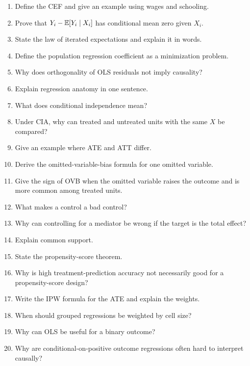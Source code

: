 \begin{enumerate}
    \item Define the CEF and give an example using wages and schooling.
    \item Prove that \(Y_i-\mathbb{E}[Y_i\mid X_i]\) has conditional mean zero given
    \(X_i\).
    \item State the law of iterated expectations and explain it in words.
    \item Define the population regression coefficient as a minimization
    problem.
    \item Why does orthogonality of OLS residuals not imply causality?
    \item Explain regression anatomy in one sentence.
    \item What does conditional independence mean?
    \item Under CIA, why can treated and untreated units with the same \(X\) be
    compared?
    \item Give an example where ATE and ATT differ.
    \item Derive the omitted-variable-bias formula for one omitted variable.
    \item Give the sign of OVB when the omitted variable raises the outcome and
    is more common among treated units.
    \item What makes a control a bad control?
    \item Why can controlling for a mediator be wrong if the target is the total
    effect?
    \item Explain common support.
    \item State the propensity-score theorem.
    \item Why is high treatment-prediction accuracy not necessarily good for a
    propensity-score design?
    \item Write the IPW formula for the ATE and explain the weights.
    \item When should grouped regressions be weighted by cell size?
    \item Why can OLS be useful for a binary outcome?
    \item Why are conditional-on-positive outcome regressions often hard to
    interpret causally?
\end{enumerate}


